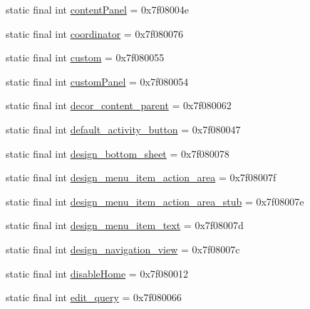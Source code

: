 \begin{CompactItemize}
\item 
static final int \hyperlink{classandroid_1_1support_1_1mediacompat_1_1_r_1_1id_8a1c1f4e2ad32e8827270b80f270ed14}{contentPanel} = 0x7f08004e
\item 
static final int \hyperlink{classandroid_1_1support_1_1mediacompat_1_1_r_1_1id_b1949aee42755e077af8a33696d01bbf}{coordinator} = 0x7f080076
\item 
static final int \hyperlink{classandroid_1_1support_1_1mediacompat_1_1_r_1_1id_7c3ac8755cd24a479ee781bf41372f71}{custom} = 0x7f080055
\item 
static final int \hyperlink{classandroid_1_1support_1_1mediacompat_1_1_r_1_1id_3e5299a3b321c233d31e9ac406d0af46}{customPanel} = 0x7f080054
\item 
static final int \hyperlink{classandroid_1_1support_1_1mediacompat_1_1_r_1_1id_b8911386d31a228c72ce171bc3f7b430}{decor\_\-content\_\-parent} = 0x7f080062
\item 
static final int \hyperlink{classandroid_1_1support_1_1mediacompat_1_1_r_1_1id_10ff438502eb16ccf473984dbe3a3e2a}{default\_\-activity\_\-button} = 0x7f080047
\item 
static final int \hyperlink{classandroid_1_1support_1_1mediacompat_1_1_r_1_1id_9722e4cc0a6f512742749d86ac9acd23}{design\_\-bottom\_\-sheet} = 0x7f080078
\item 
static final int \hyperlink{classandroid_1_1support_1_1mediacompat_1_1_r_1_1id_38c0ef758b94b298c6b29d694ddbd0b7}{design\_\-menu\_\-item\_\-action\_\-area} = 0x7f08007f
\item 
static final int \hyperlink{classandroid_1_1support_1_1mediacompat_1_1_r_1_1id_7db5886b55856e8e0c1dbcd69c4ce3d1}{design\_\-menu\_\-item\_\-action\_\-area\_\-stub} = 0x7f08007e
\item 
static final int \hyperlink{classandroid_1_1support_1_1mediacompat_1_1_r_1_1id_86359bbce64f508595ab526eb1746577}{design\_\-menu\_\-item\_\-text} = 0x7f08007d
\item 
static final int \hyperlink{classandroid_1_1support_1_1mediacompat_1_1_r_1_1id_d568344a39b3c07f651527a3d25084d1}{design\_\-navigation\_\-view} = 0x7f08007c
\item 
static final int \hyperlink{classandroid_1_1support_1_1mediacompat_1_1_r_1_1id_ca5f210711cd675ee5afd3cff799e5da}{disableHome} = 0x7f080012
\item 
static final int \hyperlink{classandroid_1_1support_1_1mediacompat_1_1_r_1_1id_edc859a50b01d4ac00827adf9ceb48ff}{edit\_\-query} = 0x7f080066
\item 

\end{CompactItemize}
